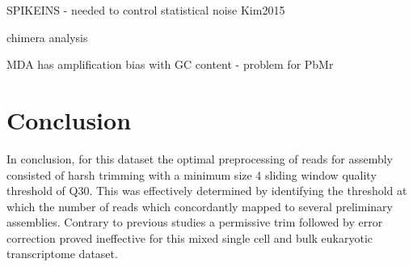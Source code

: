 


SPIKEINS - needed to control statistical noise Kim2015

chimera analysis




MDA has amplification bias with GC content - problem for PbMr \citep{Macaulay2014}

\section{Conclusion}

In conclusion, for this dataset the optimal preprocessing of reads for assembly
consisted of harsh trimming with a minimum size 4 sliding window quality threshold 
of Q30.  This was effectively determined by identifying the threshold at which
the number of reads which concordantly mapped to several preliminary assemblies. 
Contrary to previous studies a permissive trim followed by error correction proved
ineffective for this mixed single cell and bulk eukaryotic transcriptome dataset.


